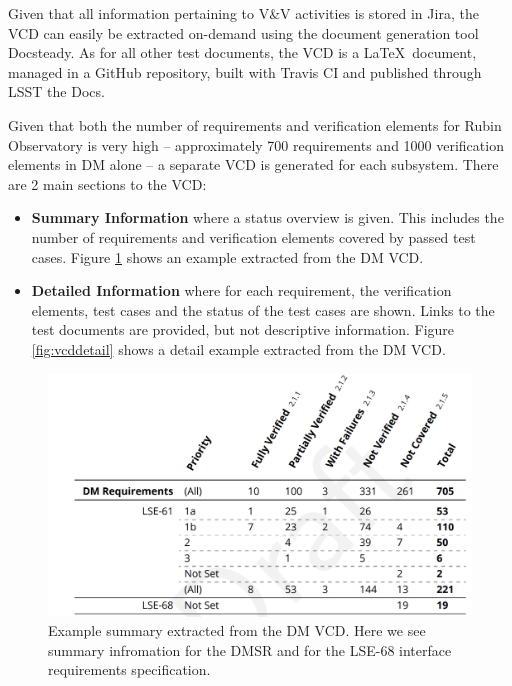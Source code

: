 Given that all information pertaining to V\&V activities is stored in Jira, the VCD can easily be extracted on-demand using the document generation tool Docsteady.
As for all other test documents, the VCD is a \LaTeX~document, managed in a GitHub repository, built with Travis CI and published through LSST the Docs.

Given that both the number of requirements and verification elements for Rubin Observatory is very high --
approximately 700 requirements and 1000 verification elements in DM alone -- a separate VCD is generated for each subsystem.
There are 2 main sections to the VCD:

\begin{itemize}
\item \textbf{Summary Information} where a status overview is given.
This includes the number of requirements and verification elements covered by passed test cases.
Figure \ref{fig:vcdsum} shows an example extracted from the DM VCD.
\item \textbf{Detailed Information} where for each requirement, the verification elements, test cases
and the status of the test cases are shown. Links to the test documents are provided, but not descriptive information.
Figure \ref{fig:vcddetail} shows a detail example extracted from the DM VCD.
\end{itemize}

\begin{figure}
\begin{center}
\includegraphics[width=\textwidth]{imgs/VCDsumm.png}
 \caption{Example summary extracted from the DM VCD. 
 Here we see summary infromation for the DMSR \cite{LSE-61} and for the LSE-68 interface requirements specification\cite{LSE-68}.}
 \label{fig:vcdsum}
\end{center}
\end{figure}

